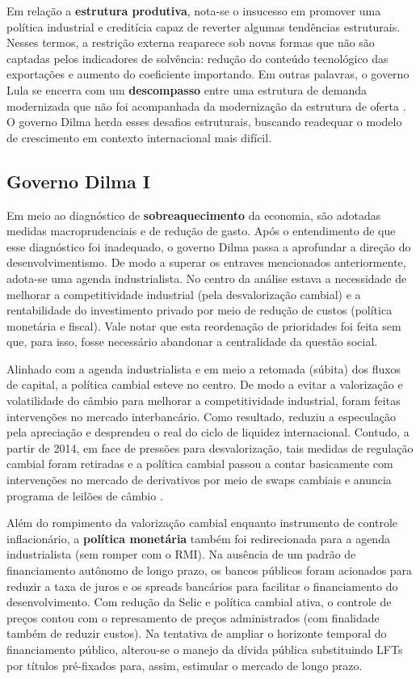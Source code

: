 \documentclass[11pt]{article}
\begin{document}
Em relação a \textbf{estrutura produtiva}, nota-se o insucesso em promover uma política industrial e creditícia capaz de reverter algumas tendências estruturais.
Nesses termos, a restrição externa reaparece sob novas formas que não são captadas pelos indicadores de solvência: redução do conteúdo tecnológico das exportações e aumento do coeficiente importando.
Em outras palavras, o governo Lula se encerra com um \textbf{descompasso} entre uma estrutura de demanda modernizada que não foi acompanhada da modernização da estrutura de oferta \cite{melloIndustrialismoAusteridadePolitica}.
O governo Dilma herda esses desafios estruturais, buscando readequar o modelo de
crescimento em contexto internacional mais difícil.

\subsection*{Governo Dilma I}
\label{sec:org4a0703d}

Em meio ao diagnóstico de \textbf{sobreaquecimento} da economia, são adotadas medidas macroprudenciais e de redução de gasto.
Após o entendimento de que esse diagnóstico foi inadequado, o governo Dilma passa a
aprofundar a direção do desenvolvimentismo.
De modo a superar os entraves mencionados anteriormente, adota-se uma agenda industrialista.
No centro da análise estava a necessidade de melhorar a competitividade industrial (pela desvalorização cambial) e a rentabilidade do investimento privado por meio de redução de custos (política monetária e fiscal). Vale notar que esta reordenação de prioridades foi feita sem que, para isso, fosse necessário abandonar a centralidade da questão social.

Alinhado com a agenda industrialista e em meio a retomada (súbita) dos fluxos de capital, a política cambial esteve no centro.
De modo a evitar a valorização e volatilidade do câmbio para melhorar a competitividade industrial, foram feitas intervenções no mercado interbancário.
Como resultado, reduziu a especulação pela apreciação e desprendeu o real do ciclo de liquidez internacional.
Contudo, a partir de 2014, em face de pressões para desvalorização, tais medidas de regulação cambial foram retiradas e a política cambial passou a contar
basicamente com intervenções no mercado de derivativos por meio de swaps cambiais e anuncia programa de leilões de câmbio
\cite{cintraFinanciamentoContasExternas2015,melloIndustrialismoAusteridadePolitica}.

Além do rompimento da valorização cambial enquanto instrumento de controle inflacionário, a \textbf{política monetária} também foi redirecionada para a agenda industrialista (sem romper com o RMI).
Na ausência de um padrão de financiamento autônomo de longo prazo, os bancos públicos foram acionados para reduzir a taxa de juros e os spreads bancários para facilitar o
financiamento do desenvolvimento.
Com redução da Selic e política cambial ativa, o controle de preços contou com o
represamento de preços administrados (com finalidade também de reduzir custos).
Na tentativa de ampliar o horizonte temporal do financiamento público, alterou-se o manejo da dívida pública substituindo LFTs por títulos pré-fixados para, assim, estimular o mercado de longo prazo. 
\end{document}
